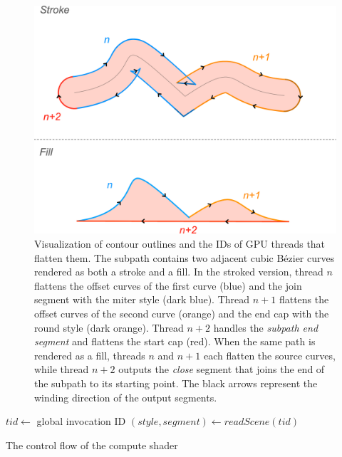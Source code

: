 \documentclass[sigconf]{acmart}
\begin{document}
\begin{center}
\begin{figure}
    \includegraphics[scale=0.18]{stroke_threads}
    \caption{Visualization of contour outlines and the IDs of GPU threads that flatten them. The subpath contains two adjacent cubic Bézier curves rendered as both a stroke and a fill. In the stroked version, thread $n$ flattens the offset curves of the first curve (blue) and the join segment with the miter style (dark blue). Thread $n + 1$ flattens the offset curves of the second curve (orange) and the end cap with the round style (dark orange). Thread $n + 2$ handles the \emph{subpath end segment} and flattens the start cap (red). When the same path is rendered as a fill, threads $n$ and $n + 1$ each flatten the source curves, while thread $n + 2$ outputs the \emph{close} segment that joins the end of the subpath to its starting point. The black arrows represent the winding direction of the output segments.}
    \label{fig:stroke_threads}
\end{figure}
\end{center}

\begin{algorithm}
  $tid \gets$ global invocation ID\;
  $(style, segment) \gets readScene(tid)$\;
\caption{The control flow of the compute shader}
\label{alg:shader-flow}
\end{algorithm}
\end{document}
